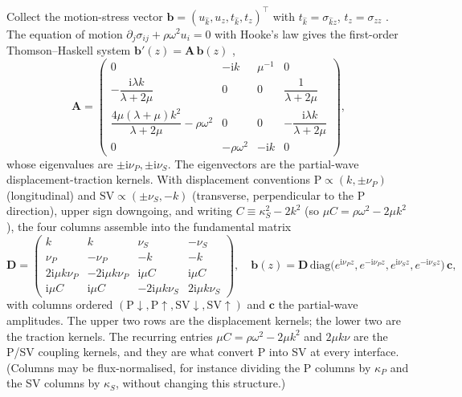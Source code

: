 \documentclass[11pt,a4paper]{article}
\newcommand{\ii}{\mathrm{i}}
\begin{document}
Collect the motion-stress vector $\mathbf{b}=(u_{\hat k},u_z,t_{\hat k},t_z)^{\top}$ with
$t_{\hat k}=\sigma_{\hat k z}$, $t_z=\sigma_{zz}$ \cite{TakeuchiSaito1972}. The equation of
motion $\partial_j\sigma_{ij}+\rho\omega^{2}u_i=0$ with Hooke's law gives the first-order
Thomson--Haskell system $\mathbf{b}'(z)=\mathbf{A}\,\mathbf{b}(z)$
\cite{Thomson1950,Haskell1953},
\begin{equation}
\mathbf{A}=\begin{pmatrix}
0 & -\ii k & \mu^{-1} & 0\\[3pt]
-\dfrac{\ii\lambda k}{\lambda+2\mu} & 0 & 0 & \dfrac{1}{\lambda+2\mu}\\[8pt]
\dfrac{4\mu(\lambda+\mu)k^{2}}{\lambda+2\mu}-\rho\omega^{2} & 0 & 0
& -\dfrac{\ii\lambda k}{\lambda+2\mu}\\[8pt]
0 & -\rho\omega^{2} & -\ii k & 0
\end{pmatrix},
\end{equation}
whose eigenvalues are $\pm\ii\nu_P,\pm\ii\nu_S$. The eigenvectors are the partial-wave
displacement-traction kernels. With displacement conventions $\mathrm{P}\propto(k,\pm\nu_P)$
(longitudinal) and $\mathrm{SV}\propto(\pm\nu_S,-k)$ (transverse, perpendicular to the P
direction), upper sign downgoing, and writing $C\equiv\kappa_S^{2}-2k^{2}$ (so
$\mu C=\rho\omega^{2}-2\mu k^{2}$), the four columns assemble into the fundamental matrix
\begin{equation}
\label{eq:Dmatrix}
\mathbf{D}=
\begin{pmatrix}
k & k & \nu_S & -\nu_S\\[2pt]
\nu_P & -\nu_P & -k & -k\\[2pt]
2\ii\mu k\nu_P & -2\ii\mu k\nu_P & \ii\mu C & \ii\mu C\\[2pt]
\ii\mu C & \ii\mu C & -2\ii\mu k\nu_S & 2\ii\mu k\nu_S
\end{pmatrix},
\quad
\mathbf{b}(z)=\mathbf{D}\,
\mathrm{diag}\big(e^{\ii\nu_P z},e^{-\ii\nu_P z},e^{\ii\nu_S z},e^{-\ii\nu_S z}\big)\,\mathbf{c},
\end{equation}
with columns ordered $(\mathrm{P}{\downarrow},\mathrm{P}{\uparrow},\mathrm{SV}{\downarrow},
\mathrm{SV}{\uparrow})$ and $\mathbf{c}$ the partial-wave amplitudes. The upper two rows are
the displacement kernels; the lower two are the traction kernels. The recurring entries
$\mu C=\rho\omega^{2}-2\mu k^{2}$ and $2\mu k\nu$ are the P/SV coupling kernels, and they are
what convert P into SV at every interface. (Columns may be flux-normalised, for instance
dividing the P columns by $\kappa_P$ and the SV columns by $\kappa_S$, without changing this
structure.)
\end{document}
